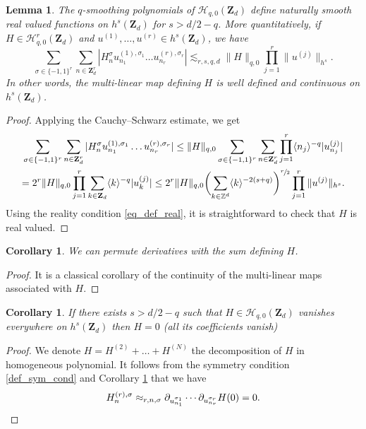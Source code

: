 \documentclass[JEP,XML,SOM,Unicode,NoEqCountersInSection,published]{cedram}
\newtheorem{corollary}[theorem]{Corollary}
\newtheorem{lemma}[theorem]{Lemma}
\theoremstyle{definition}
\begin{document}
\begin{lemma}
\label{lem_val_ham}
The $q$-smoothing polynomials of $ \mathscr{H}_{q,0}(\mathbf{Z}_d)$ define naturally smooth real valued functions on $h^s(\mathbf{Z}_d)$ for $s > d/2-q$. More quantitatively, if $H\in \mathscr{H}_{q,0}^r(\mathbf{Z}_d)$ and $u^{(1)},\dots,u^{(r)} \in h^s(\mathbf{Z}_d)$, we have
\[
\sum_{\sigma \in \{-1,1\}^r} \sum_{n\in \mathbf{Z}_d^r } | H_{n}^{\sigma} u_{n_1}^{(1),\sigma_1} \dots u_{n_r}^{(r),\sigma_r} | \lesssim_{r,s,q,d} \| H \|_{q,0} \prod_{j=1}^r\|u^{(j)} \|_{h^s}.
\]
In other words, the multi-linear map defining $H$ is well defined and continuous on $h^s(\mathbf{Z}_d)$.
\end{lemma}
\begin{proof}
Applying the Cauchy--Schwarz estimate, we get
\begin{multline*}
\sum_{\sigma \in \{-1,1\}^r} \sum_{n\in \mathbf{Z}_d^r } | H_{n}^{\sigma} u_{n_1}^{(1),\sigma_1} \dots u_{n_r}^{(r),\sigma_r} | \leq \| H \|_{q,0} \sum_{\sigma \in \{-1,1\}^r} \sum_{n\in \mathbf{Z}_d^r } \prod_{j=1}^r \langle n_j \rangle^{-q} |u_{n_j}^{(j)} |
\\ = 2^r \| H \|_{q,0} \prod_{j=1}^r \sum_{k\in \mathbf{Z}_d } \langle k \rangle^{-q} |u_{k}^{(j)} | \leq 2^r \| H \|_{q,0} \biggl(\sum_{k\in \mathbb{Z}^d } \langle k \rangle^{-2(s+q)} \biggr)^{\sfrac{r}2} \prod_{j=1}^r\|u^{(j)} \|_{h^s}.
\end{multline*}
Using the reality condition \eqref{eq_def_real}, it is straightforward to check that $H$ is real valued.
\end{proof}

\begin{corollary}
\label{cor_permute_ok}
We can permute derivatives with the sum defining $H$.
\end{corollary}
\begin{proof} It is a classical corollary of the continuity of the multi-linear maps associated with $H$.
\end{proof}

\begin{corollary}
\label{cor_uniq}
If there exists $s>d/2-q$ such that $H\in \mathscr{H}_{q,0}(\mathbf{Z}_d)$ vanishes everywhere on $h^s(\mathbf{Z}_d)$ then $H=0$ (\ie all its coefficients vanish)
\end{corollary}
\begin{proof}
We denote $H = H^{(2)} + \dots + H^{(N)}$ the decomposition of $H$ in homogeneous polynomial. It follows from the symmetry condition \eqref{def_sym_cond} and Corollary \ref{cor_permute_ok} that we have
\[
H^{(r),\sigma}_n \approx_{r,n,\sigma} \partial_{u_{n_1}^{\sigma_1}} \cdots \partial_{u_{n_{r}}^{\sigma_{r}}} H(0) = 0.\qedhere
\]
\end{proof}
\end{document}
